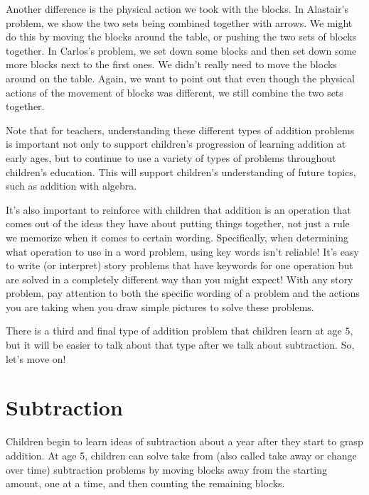 \documentclass{ximera}
\begin{document}
Another difference is the physical action we took with the blocks. In Alastair's problem, we show the two sets being combined together with arrows. We might do this by moving the blocks around the table, or pushing the two sets of blocks together. In Carlos's problem, we set down some blocks and then set down some more blocks next to the first ones. We didn't really need to move the blocks around on the table. Again, we want to point out that even though the physical actions of the movement of blocks was different, we still combine the two sets together.

Note that for teachers, understanding these different types of addition problems is important not only to support children's progression of learning addition at early ages, but to continue to use a variety of types of problems throughout children's education. This will support children's understanding of future topics, such as addition with algebra.

It's also important to reinforce with children that addition is an operation that comes out of the ideas they have about putting things together, not just a rule we memorize when it comes to certain wording. Specifically, when determining what operation to use in a word problem, using key words isn't reliable! It's easy to write (or interpret) story problems that have keywords for one operation but are solved in a completely different way than you might expect! With any story problem, pay attention to both the specific wording of a problem and the actions you are taking when you draw simple pictures to solve these problems.

There is a third and final type of addition problem that children learn at age $5$, but it will be easier to talk about that type after we talk about subtraction. So, let's move on!


\section{Subtraction}

Children begin to learn ideas of subtraction about a year after they start to grasp addition. At age 5, children can solve take from (also called take away or change over time) subtraction problems by moving blocks away from the starting amount, one at a time, and then counting the remaining blocks.
\end{document}
